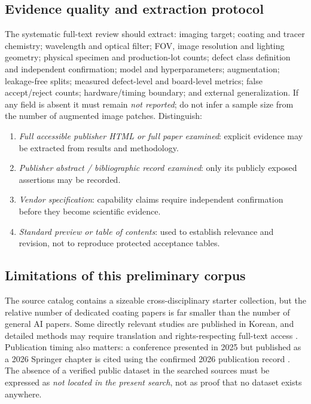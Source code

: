 \subsection{Evidence quality and extraction protocol}
The systematic full-text review should extract: imaging target; coating and tracer chemistry; wavelength and optical filter; FOV, image resolution and lighting geometry; physical specimen and production-lot counts; defect class definition and independent confirmation; model and hyperparameters; augmentation; leakage-free splits; measured defect-level and board-level metrics; false accept/reject counts; hardware/timing boundary; and external generalization. If any field is absent it must remain \emph{not reported}; do not infer a sample size from the number of augmented image patches. Distinguish:\par
\begin{enumerate}[leftmargin=*]
\item \textit{Full accessible publisher HTML or full paper examined}: explicit evidence may be extracted from results and methodology.
\item \textit{Publisher abstract / bibliographic record examined}: only its publicly exposed assertions may be recorded.
\item \textit{Vendor specification}: capability claims require independent confirmation before they become scientific evidence.
\item \textit{Standard preview or table of contents}: used to establish relevance and revision, not to reproduce protected acceptance tables.
\end{enumerate}

\subsection{Limitations of this preliminary corpus}
The source catalog contains a sizeable cross-disciplinary starter collection, but the relative number of dedicated coating papers is far smaller than the number of general AI papers. Some directly relevant studies are published in Korean, and detailed methods may require translation and rights-respecting full-text access \citep{lee2021cnn,choi2024uv}. Publication timing also matters: a conference presented in 2025 but published as a 2026 Springer chapter is cited using the confirmed 2026 publication record \citep{patel2026coverage}. The absence of a verified public dataset in the searched sources must be expressed as \emph{not located in the present search}, not as proof that no dataset exists anywhere.


